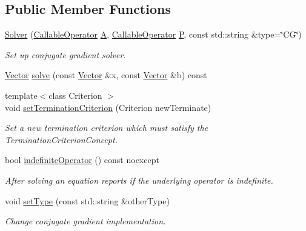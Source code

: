 \subsection*{Public Member Functions}
\begin{DoxyCompactItemize}
\item 
\hyperlink{classSpacy_1_1CG_1_1Solver_a4b6e80b42da6ee9a64cbd07f85964cd5}{Solver} (\hyperlink{namespaceSpacy_a022a87afa759e18781dd2aea9a80cd73}{Callable\-Operator} \hyperlink{classSpacy_1_1CG_1_1Solver_a9b0fa76350c42fb60b2fbeb40b343fa2}{A}, \hyperlink{namespaceSpacy_a022a87afa759e18781dd2aea9a80cd73}{Callable\-Operator} \hyperlink{classSpacy_1_1CG_1_1Solver_a929d2b9deecfd96ef7efb8097e567f37}{P}, const std\-::string \&type=\char`\"{}C\-G\char`\"{})
\begin{DoxyCompactList}\small\item\em Set up conjugate gradient solver. \end{DoxyCompactList}\item 
\hyperlink{classSpacy_1_1Vector}{Vector} \hyperlink{classSpacy_1_1CG_1_1Solver_a23770606bb41f2d8f5a6ae71d07934ab}{solve} (const \hyperlink{classSpacy_1_1Vector}{Vector} \&x, const \hyperlink{classSpacy_1_1Vector}{Vector} \&b) const 
\item 
{\footnotesize template$<$class Criterion $>$ }\\void \hyperlink{classSpacy_1_1CG_1_1Solver_a7fe2345e859b267c86acff9f3920db3b}{set\-Termination\-Criterion} (Criterion new\-Terminate)
\begin{DoxyCompactList}\small\item\em Set a new termination criterion which must satisfy the Termination\-Criterion\-Concept. \end{DoxyCompactList}\item 
bool \hyperlink{classSpacy_1_1CG_1_1Solver_ae0b6c7b754e093610df6d67bf3067acf}{indefinite\-Operator} () const noexcept
\begin{DoxyCompactList}\small\item\em After solving an equation reports if the underlying operator is indefinite. \end{DoxyCompactList}\item 
void \hyperlink{classSpacy_1_1CG_1_1Solver_a4009b5e2062e4930f0cfdc9d979c7b80}{set\-Type} (const std\-::string \&other\-Type)
\begin{DoxyCompactList}\small\item\em Change conjugate gradient implementation. \end{DoxyCompactList}\item 

\end{DoxyCompactItemize}
